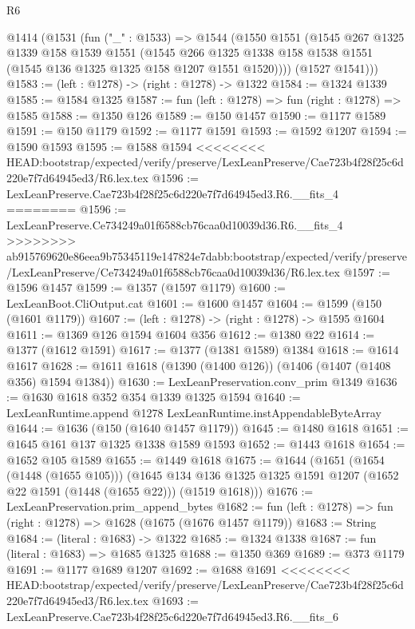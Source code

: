 \begin{lexlean}{R6}
\begin{coremodule}
{{{{{{{{{{{{{{{{{{{{{{{{{{{{{{{{{{{{{{{{{{{{{{{{{{  @1414
    (@1531
      (fun ("_" : @1533) =>
      @1544
        (@1550
          @1551
          (@1545
            @267
            @1325
            @1339
            @158
            @1539
            @1551
            (@1545
              @266
              @1325
              @1338
              @158
              @1538
              @1551
              (@1545 @136 @1325 @1325 @158 @1207 @1551 @1520))))
        (@1527 @1541)))
@1583 := (left : @1278) -> (right : @1278) -> @1322
@1584 := @1324 @1339
@1585 := @1584 @1325
@1587 := fun (left : @1278) => fun (right : @1278) => @1585
@1588 := @1350 @126
@1589 := @150 @1457
@1590 := @1177 @1589
@1591 := @150 @1179
@1592 := @1177 @1591
@1593 := @1592 @1207
@1594 := @1590 @1593
@1595 := @1588 @1594
<<<<<<<< HEAD:bootstrap/expected/verify/preserve/LexLeanPreserve/Cae723b4f28f25c6d220e7f7d64945ed3/R6.lex.tex
@1596 := LexLeanPreserve.Cae723b4f28f25c6d220e7f7d64945ed3.R6.__fits_4
========
@1596 := LexLeanPreserve.Ce734249a01f6588cb76caa0d10039d36.R6.__fits_4
>>>>>>>> ab915769620e86eea9b75345119e147824e7dabb:bootstrap/expected/verify/preserve/LexLeanPreserve/Ce734249a01f6588cb76caa0d10039d36/R6.lex.tex
@1597 := @1596 @1457
@1599 := @1357 (@1597 @1179)
@1600 := LexLeanBoot.CliOutput.cat
@1601 := @1600 @1457
@1604 := @1599 (@150 (@1601 @1179))
@1607 := (left : @1278) -> (right : @1278) -> @1595 @1604
@1611 := @1369 @126 @1594 @1604 @356
@1612 := @1380 @22
@1614 := @1377 (@1612 @1591)
@1617 := @1377 (@1381 @1589) @1384
@1618 := @1614 @1617
@1628 := @1611 @1618 (@1390 (@1400 @126)) (@1406 (@1407 (@1408 @356) @1594 @1384))
@1630 := LexLeanPreservation.conv_prim @1349
@1636 := @1630 @1618 @352 @354 @1339 @1325 @1594
@1640 := LexLeanRuntime.append @1278 LexLeanRuntime.instAppendableByteArray
@1644 := @1636 (@150 (@1640 @1457 @1179))
@1645 := @1480 @1618
@1651 := @1645 @161 @137 @1325 @1338 @1589 @1593
@1652 := @1443 @1618
@1654 := @1652 @105 @1589
@1655 := @1449 @1618
@1675 := @1644
    (@1651
      (@1654 (@1448 (@1655 @105)))
      (@1645 @134 @136 @1325 @1325 @1591 @1207 (@1652 @22 @1591 (@1448 (@1655 @22))) (@1519 @1618)))
@1676 := LexLeanPreservation.prim_append_bytes
@1682 := fun (left : @1278) => fun (right : @1278) => @1628 (@1675 (@1676 @1457 @1179))
@1683 := String
@1684 := (literal : @1683) -> @1322
@1685 := @1324 @1338
@1687 := fun (literal : @1683) => @1685 @1325
@1688 := @1350 @369
@1689 := @373 @1179
@1691 := @1177 @1689 @1207
@1692 := @1688 @1691
<<<<<<<< HEAD:bootstrap/expected/verify/preserve/LexLeanPreserve/Cae723b4f28f25c6d220e7f7d64945ed3/R6.lex.tex
@1693 := LexLeanPreserve.Cae723b4f28f25c6d220e7f7d64945ed3.R6.__fits_6
}}}}}}}}}}}}}}}}}}}}}}}}}}}}}}}}}}}}}}}}}}}}}}}}}}
\end{coremodule}
\end{lexlean}
